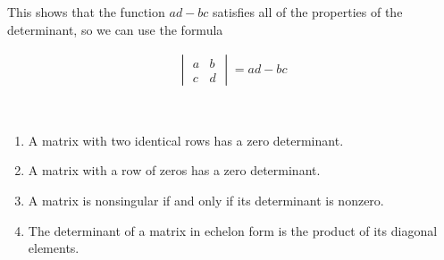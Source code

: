 \begin{example}
\begin{enumerate}
\end{enumerate}

This shows that the function $ad-bc$ satisfies all of the properties of the determinant, so we can use the formula

\begin{align*}
\begin{vmatrix} a & b \\ c & d
\end{vmatrix} = ad-bc
\end{align*}



\end{example}


\begin{lemma} ~

\begin{enumerate}
\item A matrix with two identical rows has a zero determinant.
\item A matrix with a row of zeros has a zero determinant.
\item A matrix is nonsingular if and only if its determinant is nonzero.
\item The determinant of a matrix in echelon form is the product of its diagonal elements.
\end{enumerate}
\end{lemma}

